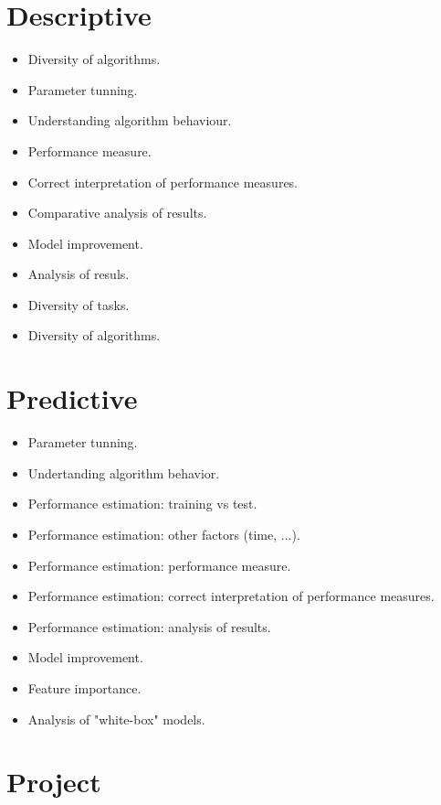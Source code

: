 \documentclass[a4paper,12pt]{report}
\begin{document}
\chapter{Descriptive}

\begin{itemize}
    \item Diversity of algorithms.
    \item Parameter tunning.
    \item Understanding algorithm behaviour.
    \item Performance measure.
    \item Correct interpretation of performance measures.
    \item Comparative analysis of results.
    \item Model improvement.
    \item Analysis of resuls.
	\item Diversity of tasks.
	\item Diversity of algorithms.
\end{itemize}


\chapter{Predictive}

\begin{itemize}
    \item Parameter tunning.
	\item Undertanding algorithm behavior.
	\item Performance estimation: training vs test.
	\item Performance estimation: other factors (time, ...).
	\item Performance estimation: performance measure.
	\item Performance estimation: correct interpretation of performance measures.
	\item Performance estimation: analysis of results.
	\item Model improvement.
	\item Feature importance.
	\item Analysis of "white-box" models.
\end{itemize}
	


\chapter{Project}
\end{document}
